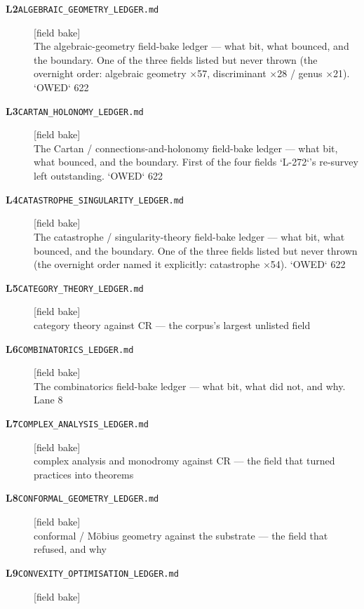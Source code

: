 \begin{description}
\item[\textbf{L2}\quad\texttt{ALGEBRAIC\_GEOMETRY\_LEDGER.md}]\hfill\textsf{[field bake]}\\
The algebraic-geometry field-bake ledger --- what bit, what bounced, and the boundary. One of the three fields listed but never thrown (the overnight order: algebraic geometry $\times$57, discriminant $\times$28 / genus $\times$21). `OWED` 622
\item[\textbf{L3}\quad\texttt{CARTAN\_HOLONOMY\_LEDGER.md}]\hfill\textsf{[field bake]}\\
The Cartan / connections-and-holonomy field-bake ledger --- what bit, what bounced, and the boundary. First of the four fields `L-272`'s re-survey left outstanding. `OWED` 622
\item[\textbf{L4}\quad\texttt{CATASTROPHE\_SINGULARITY\_LEDGER.md}]\hfill\textsf{[field bake]}\\
The catastrophe / singularity-theory field-bake ledger --- what bit, what bounced, and the boundary. One of the three fields listed but never thrown (the overnight order named it explicitly: catastrophe $\times$54). `OWED` 622
\item[\textbf{L5}\quad\texttt{CATEGORY\_THEORY\_LEDGER.md}]\hfill\textsf{[field bake]}\\
category theory against CR --- the corpus's largest unlisted field
\item[\textbf{L6}\quad\texttt{COMBINATORICS\_LEDGER.md}]\hfill\textsf{[field bake]}\\
The combinatorics field-bake ledger --- what bit, what did not, and why. Lane 8
\item[\textbf{L7}\quad\texttt{COMPLEX\_ANALYSIS\_LEDGER.md}]\hfill\textsf{[field bake]}\\
complex analysis and monodromy against CR --- the field that turned practices into theorems
\item[\textbf{L8}\quad\texttt{CONFORMAL\_GEOMETRY\_LEDGER.md}]\hfill\textsf{[field bake]}\\
conformal / M\"obius geometry against the substrate --- the field that refused, and why
\item[\textbf{L9}\quad\texttt{CONVEXITY\_OPTIMISATION\_LEDGER.md}]\hfill\textsf{[field bake]}\\

\end{description}
